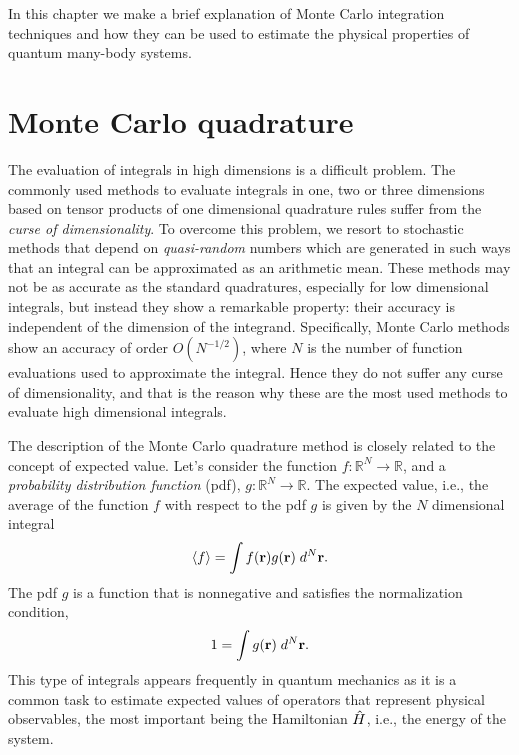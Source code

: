 In this chapter we make a brief explanation of Monte Carlo integration
techniques and how they can be used to estimate the physical properties of
quantum many-body systems.




\section{Monte Carlo quadrature}

The evaluation of integrals in high dimensions is a difficult problem. The
commonly used methods to evaluate integrals in one, two or three dimensions
based on tensor products of one dimensional quadrature rules suffer from the
\emph{curse of dimensionality}. To overcome this problem, we resort to
stochastic methods that depend on \emph{quasi-random} numbers which are
generated in such ways that an integral can be approximated as an arithmetic
mean. These methods may not be as accurate as the standard quadratures,
especially for low dimensional integrals, but instead they show a remarkable
property: their accuracy is independent of the dimension of the integrand.
Specifically, Monte Carlo methods show an accuracy of order $O(N^{-1/2})$, where
$N$ is the number of function evaluations used to approximate the integral.
Hence they do not suffer any curse of dimensionality, and that is the reason why
these are the most used methods to evaluate high dimensional integrals.

%

The description of the Monte Carlo quadrature method is closely related to the
concept of expected value. Let's consider the function $f: \mathbb{R}^N
\rightarrow \mathbb{R}$, and a \emph{probability distribution function} (pdf),
$g: \mathbb{R}^N \rightarrow \mathbb{R}$. The expected value, i.e., the average
of the function $f$ with respect to the pdf $g$ is given by the $N$ dimensional
integral
%
\begin{equation}
	\label{eq:expected-value-def}
	\langle f \rangle = \int f(\mathbf r) g(\mathbf r) \; d^N \mathbf{r}.
\end{equation}
%
The pdf $g$ is a function that is nonnegative and satisfies the normalization
condition,
%
\begin{equation}
	1 = \int g(\mathbf r) \; d^N \mathbf{r}.
\end{equation}
%
This type of integrals appears frequently in quantum mechanics as it is a common
task to estimate expected values of operators that represent physical
observables, the most important being the Hamiltonian ${\hat{H}}$, i.e., the
energy of the system.

